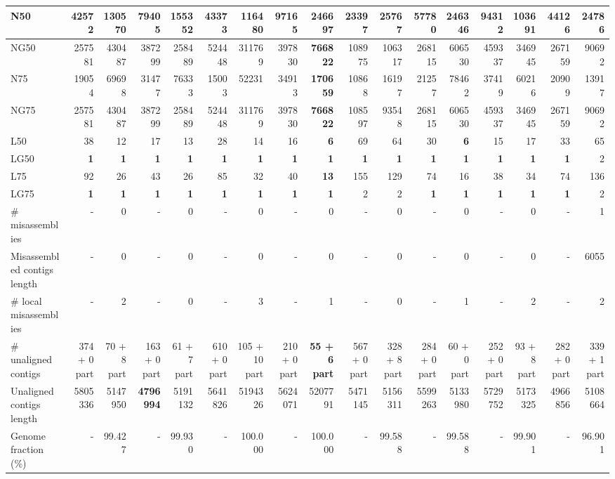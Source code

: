 \documentclass[12pt,a4paper]{article}
\begin{document}
\begin{table}[ht]
\begin{center}
\begin{tabular}{|l*{16}{|r}|}
N50 & 42572 & 130570 & 79405 & 155352 & 43373 & 116480 & 97165 & {\bf 246697} & 23397 & 25767 & 57780 & 246346 & 94312 & 103691 & 44126 & 24786 \\ \hline
NG50 & 257581 & 430487 & 387299 & 258489 & 524448 & 311769 & 397830 & {\bf 766822} & 108975 & 106317 & 268115 & 606530 & 459337 & 346945 & 267159 & 90692 \\ \hline
N75 & 19054 & 69698 & 31477 & 76333 & 15003 & 52231 & 34913 & {\bf 170659} & 10868 & 16197 & 21257 & 78462 & 37419 & 60216 & 20909 & 13917 \\ \hline
NG75 & 257581 & 430487 & 387299 & 258489 & 524448 & 311769 & 397830 & {\bf 766822} & 108597 & 93548 & 268115 & 606530 & 459337 & 346945 & 267159 & 90692 \\ \hline
L50 & 38 & 12 & 17 & 13 & 28 & 14 & 16 & {\bf 6} & 69 & 64 & 30 & {\bf 6} & 15 & 17 & 33 & 65 \\ \hline
LG50 & {\bf 1} & {\bf 1} & {\bf 1} & {\bf 1} & {\bf 1} & {\bf 1} & {\bf 1} & {\bf 1} & {\bf 1} & {\bf 1} & {\bf 1} & {\bf 1} & {\bf 1} & {\bf 1} & {\bf 1} & 2 \\ \hline
L75 & 92 & 26 & 43 & 26 & 85 & 32 & 40 & {\bf 13} & 155 & 129 & 74 & 16 & 38 & 34 & 74 & 136 \\ \hline
LG75 & {\bf 1} & {\bf 1} & {\bf 1} & {\bf 1} & {\bf 1} & {\bf 1} & {\bf 1} & {\bf 1} & 2 & 2 & {\bf 1} & {\bf 1} & {\bf 1} & {\bf 1} & {\bf 1} & 2 \\ \hline
\# misassemblies & - & 0 & - & 0 & - & 0 & - & 0 & - & 0 & - & 0 & - & 0 & - & 1 \\ \hline
Misassembled contigs length & - & 0 & - & 0 & - & 0 & - & 0 & - & 0 & - & 0 & - & 0 & - & 6055 \\ \hline
\# local misassemblies & - & 2 & - & 0 & - & 3 & - & 1 & - & 0 & - & 1 & - & 2 & - & 2 \\ \hline
\# unaligned contigs & 374 + 0 part & 70 + 8 part & 163 + 0 part & 61 + 7 part & 610 + 0 part & 105 + 10 part & 210 + 0 part & {\bf 55 + 6 part} & 567 + 0 part & 328 + 8 part & 284 + 0 part & 60 + 0 part & 252 + 0 part & 93 + 8 part & 282 + 0 part & 339 + 1 part \\ \hline
Unaligned contigs length & 5805336 & 5147950 & {\bf 4796994} & 5191132 & 5641826 & 5194326 & 5624071 & 5207791 & 5471145 & 5156311 & 5599263 & 5133980 & 5729752 & 5173325 & 4966856 & 5108664 \\ \hline
Genome fraction (\%) & - & 99.427 & - & 99.930 & - & 100.000 & - & 100.000 & - & 99.588 & - & 99.588 & - & 99.901 & - & 96.901 \\ \hline

\end{tabular}
\end{center}
\end{table}
\end{document}
